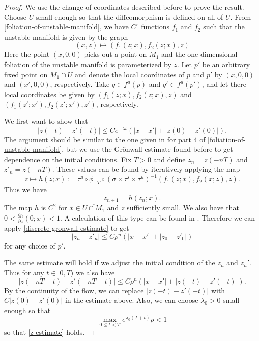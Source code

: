 \begin{proof}
	We use the change of coordinates described before to prove the result. Choose \(U\) small enough so that the diffeomorphism is defined on all of \(U\). From \cref{foliation-of-unstable-manifold}, we have \(C^r\) functions \(f_1\) and \(f_2\) such that the unstable manifold is given by the graph
	\begin{equation*}
		(x,z) \mapsto (f_1(z; x),  f_2(z;x),  z)
	\end{equation*}
	Here the point \((x,0,0)\) picks out a point on \( M_1\) and the one-dimensional foliation of the unstable manifold is parameterized by \(z\).
	Let \(p'\) be an arbitrary fixed point on \( M_1\cap U\) and denote the local coordinates of \(p\) and \(p'\) by \((x,0,0)\) and \((x',0,0)\), respectively. Take \(q \in f^u(p)\) and \(q' \in f^u(p')\), and let there local coordinates be given by \((f_1(z;x), f_2(z; x), z)\) and \((f_1(z';x') , f_2(z';x'), z')\), respectively. 
	
	We first want to show that 
	\begin{equation}\label{z-estimate}
		|z(-t) - z'(-t)| \leq C e^{-\lambda t} (|x- x'| + |z(0) - z'(0)|).
	\end{equation}
	The argument should be similar to the one given in \cite{wiggins1994normally} for part 4 of \cref{foliation-of-unstable-manifold}, but we use the Gr\"onwall estimate found before to get dependence on the initial conditions. Fix \(T>0\) and define \(z_n = z(-nT)\) and \(z'_{n} = z(-nT)\). These values can be found by iteratively applying the map
	\begin{equation*}
		z \mapsto h(z;x) := \tau^u \circ \phi_{-T} \circ (\sigma \times \tau^s \times \tau^u)^{-1}(f_1(z;x), f_2(x;z), z).
	\end{equation*}
	Thus we have 
	\begin{equation*}
		z_{n+1} = h(z_{n}; x).
	\end{equation*}
	The map \(h\) is \(C^2\) for \(x\in \overline {U\cap M_1}\) and \(z\) sufficiently small. We also have that \(0 < \frac{\partial h}{\partial z}(0;x) < 1\). A calculation of this type can be found in \cite{wiggins1994normally}. Therefore we can apply \cref{discrete-gronwall-estimate} to get 
	\begin{equation*}
		|z_n - z'_n| \leq C \rho^n (|x-x'| + |z_0 - z'_0|)
	\end{equation*}
	for any choice of \(p'\).
	
	The same estimate will hold if we adjust the initial condition of the \(z_n\) and \(z_n'\). Thus for any \(t\in [0,T)\) we also have
	\begin{equation*}
		|z(-nT - t) - z'(-nT - t)| \leq C \rho^n (|x-x'| + |z(-t) - z'(-t)|).
	\end{equation*}
	By the continuity of the flow, we can replace \(|z(-t) - z'(-t)|\) with \(C|z(0) - z'(0)|\) in the estimate above. Also, we can choose \(\lambda_0 > 0\) small enough so that
	\begin{equation*}
		\max_{0\leq t < T} e^{\lambda_0 (T + t)} \rho < 1
	\end{equation*}
	so that \cref{z-estimate} holds.
	

\end{proof}
